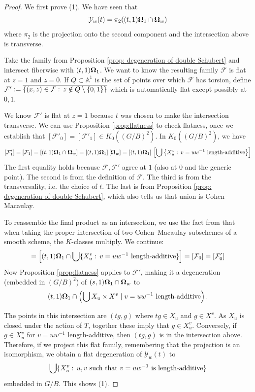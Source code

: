 \documentclass[10pt,a4paper]{amsart}
\newcommand\bOm{{\bf \Omega}}
\def\AA{{\mathbb A }}
\newcommand\Union\bigcup
\newcommand\calY{{\mathcal Y}}
\newcommand\calF{{\mathcal F}}
\renewcommand\AA{{\mathbb A}}
\renewcommand{\colon}{\mathrel{:}}
\renewcommand{\colon}{:\mkern\thinmuskip}
\begin{document}
\begin{proof}
  We first prove (1). We have seen that
  \[ \calY_w(t) = \pi_2((t , 1) \bOm_1 \cap \bOm_w)
  \]
  where $\pi_2$ is the projection onto the second component and the
  intersection above is transverse.

  Take the family from Proposition \ref{prop: degeneration of double Schubert}
  and intersect fiberwise with $(t,1)\bOm_1$. We want to know the resulting
  family $\calF$ is flat at $z=1$ and $z=0$. If $Q \subset \AA^1$ is
  the set of points over which $\calF$ has torsion, define
  $\calF' := \overline{ \{(x,z) \in \calF\colon z \notin Q\setminus\{0,1\} \}}$
  which is automatically flat except possibly at $0,1$.
 
  We know $\calF'$ is flat at $z=1$ because $t$ was chosen to make the
  intersection transverse. 
  We can use Proposition \ref{prop:flatness} to check flatness,
  once we establish that $[\calF'_0] = [\calF'_1] \in K_0((G/B)^2)$. In $K_0((G/B)^2)$, we have
  \[
    [\calF'_1]
    = [\calF_1] 
    = [(t,1)\bOm_1 \cap \bOm_w] 
    = [(t,1)\bOm_1] \, [\bOm_w] 
    = [(t,1)\bOm_1] \, \left[
      \Union \left\{ X_{u}^v \colon v= uw^{-1}\text{ length-additive} \right\} \right]
  \]
  The first equality holds because $\calF,\calF'$ agree at $1$
  (also at $0$ and the generic point).
  The second is from the definition of $\calF$.
  The third is from the transversality, i.e. the choice of $t$. 
  The last is from Proposition \ref{prop: degeneration of double Schubert},
  which also tells us that union is Cohen--Macaulay. 

  To reassemble the final product as an intersection, we use the fact
  from \cite[proof of Proposition 7.1]{fulton2013intersection}
  that when taking the proper intersection %
  of two Cohen--Macaulay subschemes of a smooth scheme, the $K$-classes multiply.
  We continue:
  \[ = \left[ (t,1)\bOm_1 \cap
      \bigcup \{ X_{u}^v \colon v= uw^{-1}\text{ length-additive} \}
    \right]
    = [\calF_0] = [\calF'_0]
  \]
  Now Proposition \ref{prop:flatness} applies to $\calF'$, making it a
  degeneration (embedded in $(G/B)^2$) of $(s,1)\bOm_1 \cap \bOm_w$ to
  \begin{align*}
    (t , 1) \bOm_1 \cap \left ( \bigcup X_u \times X^v \; \lvert \; v = uw^{-1} \text{ length-additive} \right ). 
  \end{align*}
  
  The points in this intersection are $(tg,g)$ where $tg \in X_u$ and
  $g \in X^v$. As $X_u$ is closed under the action of $T$, 
  together these imply that $g \in X_u^v$. Conversely, if
  $g \in X_u^v$ for $v=uw^{-1}$ length-additive, then $(tg,g)$ is in
  the intersection above. Therefore, if we project this flat family,
  remembering that the projection is an isomorphism, we obtain a flat
  degeneration of $\calY_w(t)$ to
  \[\Union \{ X_{u}^v\colon u,v\text{ such that }v= uw^{-1}\text{ is length-additive} \} \]
  embedded in $G/B$.
  This shows (1).
  

\end{proof}
\end{document}
